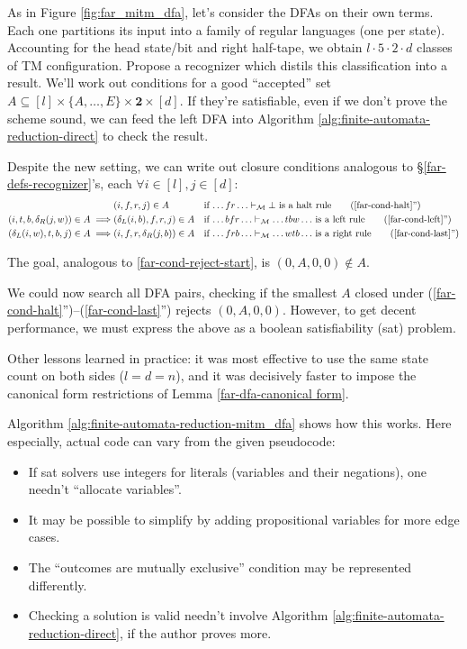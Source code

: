 As in Figure \ref{fig:far_mitm_dfa}, let's consider the DFAs on their own terms.
Each one partitions its input into a family of regular languages (one per state).
Accounting for the head state/bit and right half-tape, we obtain $l\cdot 5\cdot 2\cdot d$ classes of TM configuration.
Propose a recognizer which distils this classification into a result.
We'll work out conditions for a good ``accepted'' set $A\subseteq[l]\times\{A,\ldots,E\}\times\mathbf{2}\times[d]$.
If they're satisfiable, even if we don't prove the scheme sound, we can feed the left DFA into Algorithm \ref{alg:finite-automata-reduction-direct} to check the result.

Despite the new setting, we can write out closure conditions analogous to \S\ref{far-defs-recognizer}'s, each $\forall i\in[l],j\in[d]$:
\begin{align}
                                         & (i,f,r,j)\in A
                                         &                               & \text{if $\ldots fr\ldots\vdash_\mathcal{M}\bot$ is a halt rule}
  \tag{\ref{far-cond-halt}''}
  \\
  (i, t, b, \delta_R(j,w))\in A \implies & (\delta_L(i,b), f, r, j)\in A
                                         &                               & \text{if $\ldots bfr\ldots\vdash_\mathcal{M}\ldots tbw\ldots$ is a left rule}
  \tag{\ref{far-cond-left}''}
  \\
  (\delta_L(i,w), t, b, j)\in A \implies & (i, f, r, \delta_R(j,b))\in A
                                         &                               & \text{if $\ldots frb\ldots\vdash_\mathcal{M}\ldots wtb\ldots$ is a right rule}
  \tag{\ref{far-cond-last}''}
\end{align}

The goal, analogous to \eqref{far-cond-reject-start}, is $(0, A, 0, 0)\notin A$.

We could now search all DFA pairs, checking if the smallest $A$ closed under (\ref{far-cond-halt}'')--(\ref{far-cond-last}'') rejects $(0,A,0,0)$.
However, to get decent performance, we must express the above as a boolean satisfiability ({\sc sat}) problem.

Other lessons learned in practice:
it was most effective to use the same state count on both sides ($l=d=n$),
and it was decisively faster to impose the canonical form restrictions of Lemma \ref{far-dfa-canonical form}.

Algorithm \ref{alg:finite-automata-reduction-mitm_dfa} shows how this works.
Here especially, actual code can vary from the given pseudocode:
\begin{itemize}
  \item If {\sc sat} solvers use integers for literals (variables and their negations), one needn't ``allocate variables''.
  \item It may be possible to simplify by adding propositional variables for more edge cases.
  \item The ``outcomes are mutually exclusive'' condition may be represented differently.
  \item Checking a solution is valid needn't involve Algorithm \ref{alg:finite-automata-reduction-direct}, if the author proves more.
\end{itemize}

